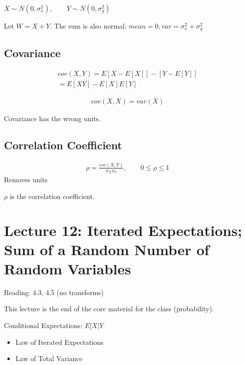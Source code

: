 \documentclass{article}
\begin{document}

$X \sim N(0, \sigma_x^2), \qquad Y \sim N(0, \sigma_y^2)$

Let $W=X+Y$.  The sum is also normal: $mean=0,var=\sigma_x^2 + \sigma_y^2$

\subsection{Covariance}


\begin{align*}
    cov(X,Y)=E[X-E[X]] - [Y - E[Y]] \\
    = E[XY] - E[X]E[Y]
\end{align*}

\begin{align*}
cov(X,X)=var(X)
\end{align*}

Covariance has the wrong units.

\subsection{Correlation Coefficient}


\begin{align*}
\rho = \frac{cov(X,Y)}{\sigma_X \sigma_Y}, \qquad 0 \le \rho \le 1
\end{align*}
Removes units

$\rho$ is the correlation coefficient.

\section{Lecture 12: Iterated Expectations; Sum of a Random Number of Random Variables}


Reading: 4.3, 4.5 (no transforms)

This lecture is the end of the core material for the class (probability).

Conditional Expectations: $E[X|Y$
\begin{itemize}
    \item Law of Iterated Expectations
    \item Law of Total Variance
\end{itemize}
\end{document}
